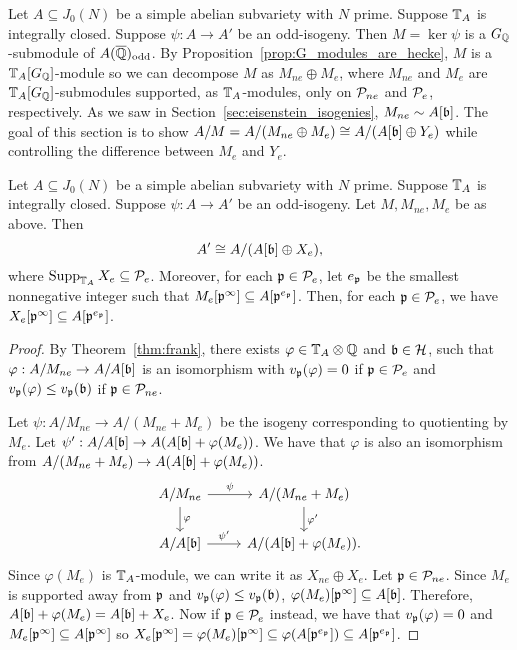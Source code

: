 \documentclass[thesis.tex]{subfiles}
\begin{document}
Let $A\subseteq J_0(N)$ be a simple abelian subvariety with $N$ prime. Suppose
$\TT_A$ is integrally closed. Suppose $\psi:A\to A'$ be an odd-isogeny. Then
$M=\ker\psi$ is a $G_\QQ$-submodule of $A(\QQbar)_\odd$. By
Proposition~\ref{prop:G_modules_are_hecke}, $M$ is a $\TT_A[G_\QQ]$-module so
we can decompose $M$ as $M_{ne}\oplus M_e$, where $M_{ne}$ and $M_e$ are
$\TT_A[G_\QQ]$-submodules supported, as $\TT_A$-modules, only on $\P_{ne}$ and
$\P_e$, respectively. As we saw in Section~\ref{sec:eisenstein_isogenies},
$M_{ne}\sim A[\b]$. The goal of this section is to show $A/M=A/(M_{ne}\oplus
M_e) \cong A/(A[\b]\oplus Y_e)$ while controlling the difference between $M_e$
and $Y_e$.


\begin{proposition}%
    \label{prop:controll_supp}
    Let $A\subseteq J_0(N)$ be a simple abelian subvariety with $N$ prime.
    Suppose $\TT_A$ is integrally closed. Suppose $\psi:A\to A'$ be an
    odd-isogeny. Let $M, M_{ne}, M_e$ be as above. Then
    \[
        A'\isom A/(A[\b]\oplus X_e),
    \]
    where $\Supp_{\TT_A} X_e\subseteq \P_e$. Moreover, for each $\p\in \P_e$,
    let $e_\p$ be the smallest nonnegative integer such that
    $M_e[\p^{\infty}]\subseteq A[\p^{e_\p}]$. Then, for each $\p\in \P_e$, we
    have $X_e[\p^\infty]\subseteq A[\p^{e_\p}]$.
\end{proposition}
\begin{proof}
    By Theorem~\ref{thm:frank}, there exists $\varphi\in \TT_A\otimes \QQ$ and
    $\b\in \H$, such that $\varphi:A/M_{ne}\to A/A[\b]$ is an isomorphism with
    $v_\p(\varphi)=0$ if $\p\in \P_e$ and $v_\p(\varphi)\leq v_\p(\b)$ if
    $\p\in \P_{ne}$.

    Let $\psi:A/M_{ne}\to A/(M_{ne}+M_e)$ be the isogeny corresponding to
    quotienting by $M_e$. Let $\psi':A/A[\b]\to A(A[\b]+\varphi(M_e))$. We have
    that $\varphi$ is also an isomorphism from $A/(M_{ne}+M_e)\to
    A(A[\b]+\varphi(M_e))$. 
    \[
        \begin{tikzcd}
            A/M_{ne}
            \arrow[r, "\psi"]
            \arrow[d, "\varphi"]
            &
            A/(M_{ne}+M_e)
            \arrow[d, "\varphi'"]
            \\
            A/A[\b]
            \arrow[r, "\psi'"]
            &
            A/(A[\b]+\varphi(M_e)).
        \end{tikzcd}
    \] 
    Since $\varphi(M_e)$ is $\TT_A$-module, we can write it as $X_{ne}\oplus
    X_e$. Let $\p\in \P_{ne}$. Since $M_e$ is supported away from $\p$ and
    $v_\p(\varphi)\leq v_\p(\b)$, $\varphi(M_e)[\p^\infty]\subseteq A[\b]$.
    Therefore, $A[\b] + \varphi(M_e)=A[\b] + X_{e}$. Now if $\p\in \P_e$
    instead, we have that $v_\p(\varphi)=0$ and $M_e[\p^\infty]\subseteq
    A[\p^\infty]$ so $X_e[\p^\infty]=\varphi(M_e)[\p^\infty]\subseteq
    \varphi(A[\p^{e_\p}])\subseteq A[\p^{e_\p}]$.
\end{proof}
\end{document}

